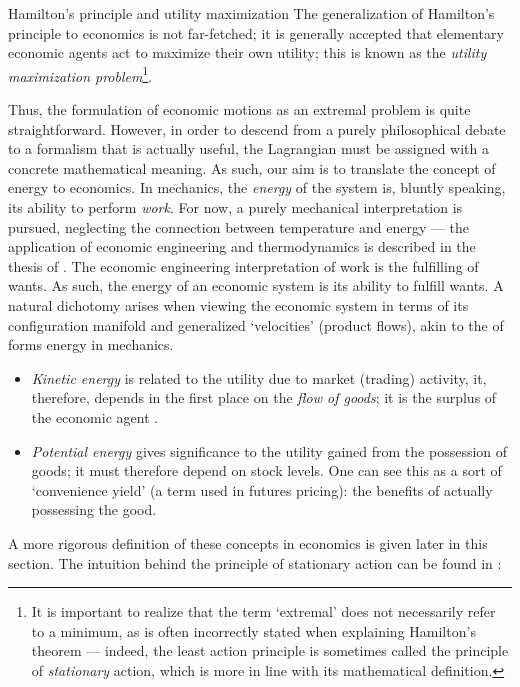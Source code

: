 \begin{econ}{Hamilton's principle and utility maximization}
    The generalization of Hamilton's principle to economics is not far-fetched; it is generally accepted that elementary economic agents act to maximize their own utility; this is known as the \emph{utility maximization problem}\footnote{It is important to realize that the term `extremal' does not necessarily refer to a minimum, as is often incorrectly stated when explaining Hamilton's theorem --- indeed, the least action principle is sometimes called the principle of \emph{stationary} action, which is more in line with its mathematical definition.}. \\

    Thus, the formulation of economic motions as an extremal problem is quite straightforward. However, in order to descend from a purely philosophical debate to a formalism that is actually useful, the Lagrangian must be assigned with a concrete mathematical meaning. As such, our aim is to translate the concept of energy to economics. In mechanics, the \emph{energy} of the system is, bluntly speaking, its ability to perform \emph{work}. For now, a purely mechanical interpretation is pursued, neglecting the connection between temperature and energy --- the application of economic engineering and thermodynamics is described in the thesis of \citet{Manders2019}. The economic engineering interpretation of work is the fulfilling of wants. As such, the energy of an economic system is its ability to fulfill wants. A natural dichotomy arises when viewing the economic system in terms of its configuration manifold and generalized `velocities' (product flows), akin to the of forms energy in mechanics.
    \begin{itemize}
        \item \emph{Kinetic energy} is related to the utility due to market (trading) activity, it, therefore, depends in the first place on the \emph{flow of goods}; it is the surplus of the economic agent \cite{Mankiw2017}.
        \item \emph{Potential energy} gives significance to the utility gained from the possession of goods; it must therefore depend on stock levels. One can see this as a sort of `convenience yield' (a term used in futures pricing): the benefits of actually possessing the good.
    \end{itemize}
    A more rigorous definition of these concepts in economics is given later in this section. The intuition behind the principle of stationary action can be found in \citet{Feynman2010}:

\end{econ}
